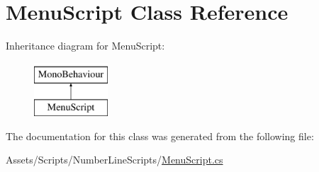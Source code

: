 \hypertarget{classMenuScript}{}\section{Menu\+Script Class Reference}
\label{classMenuScript}
Inheritance diagram for Menu\+Script\+:\begin{figure}[H]
\begin{center}
\leavevmode
\includegraphics[height=2.000000cm]{classMenuScript}
\end{center}
\end{figure}


The documentation for this class was generated from the following file\+:\begin{DoxyCompactItemize}
\item 
Assets/\+Scripts/\+Number\+Line\+Scripts/\hyperlink{MenuScript_8cs}{Menu\+Script.\+cs}\end{DoxyCompactItemize}
